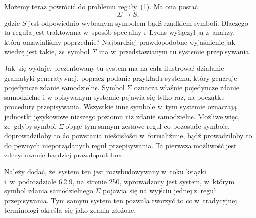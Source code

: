 \documentclass[a4paper,11pt]{article}
\begin{document}
Możemy teraz powrócić do problemu reguły~(1). Ma ona postać
\begin{equation}
  \label{eq:Lyons-Wstep-do-jezykoznawstwa-07}
  \Sigma \to S,
\end{equation}
gdzie $S$ jest odpowiednio wybranym symbolem bądź rządkiem symboli. Dlaczego ta reguła jest traktowana
w~sposób specjalny i~Lyons wyłączył ją z~analizy, którą omawialiśmy poprzednio?
Najbardziej prawdopodobne wyjaśnienie jak wiedzę jest takie, że~symbol $\Sigma$ ma
w~przedstawianym tu systemie przepisywania.

Jak~się wydaje, prezentowany tu system ma na calu ilustrować działanie gramatyki generatywnej, poprzez podanie przykładu
systemu, który generuje pojedyncze zdanie samodzielne. Symbol $\Sigma$ oznacza właśnie pojedyncze zdanie samodzielne i w opisywanym
systemie pojawia się tylko raz, na początku procedury przepisywania. Wszystkie inne symbole
w~tym systemie oznaczają jednostki językowowe niższego poziomu niż zdanie samodzielne.
Możliwe więc, że~gdyby symbol $\Sigma$ objąć tym samym zestawe reguł co pozostałe symbole, doprowadziłoby
to do powstania nieścisłości w~formaliźmie, bądź prowadziłoby to do pewnych nieporządanych reguł przepisywania.
Ta pierwsza możliwość jest zdecydowanie bardziej prawdopodobna.

Należy dodać, że~system ten jest rozwbudowywany w~toku książki i~w~podrozdziale 6.2.9, na stronie 250,
wprowadzony jest system, w~którym symbol zdania samodzielnego $\Sigma$ pojawia~się na wyjściu jednej z~reguł
przepisywania. Tym samym system ten pozwala tworzyć to co w~tradycyjnej terminologi określa~się jako zdania
złożone.

\vspace{\spaceFour}





\newpage

\end{document}
